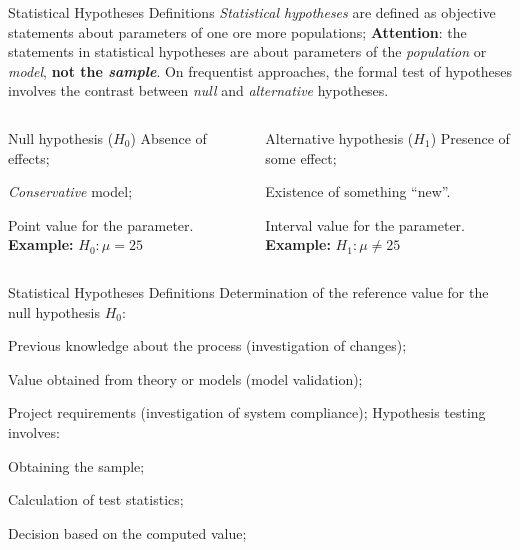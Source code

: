 \documentclass[t]{beamer}
\begin{document}

\begin{ftst}
{Statistical Hypotheses}
{Definitions}
\textit{Statistical hypotheses} are defined as objective statements about parameters of one ore more populations;
\vone
\textbf{Attention}: the statements in statistical hypotheses are about parameters of the \textit{population} or \textit{model}, \textbf{not the \textit{sample}}.
\vone
On frequentist approaches, the formal test of hypotheses involves the contrast between \textit{null} and \textit{alternative} hypotheses.
\begin{columns}[T]
	\begin{block}{Null hypothesis ($H_0$)}
	\small
	\bitems Absence of effects;
	\item \textit{Conservative} model;
	\item Point value for the parameter.\eitem
	\textbf{Example:} $H_0: \mu = 25$
	\end{block}
	\begin{block}{Alternative hypothesis ($H_1$)}
	\small 
	\bitems Presence of some effect;
	\item Existence of something ``new''.
	\item Interval value for the parameter.\eitem
	\textbf{Example:} $H_1: \mu \neq 25$
		\end{block}
	\end{columns}
\end{ftst}


\begin{ftst}
{Statistical Hypotheses}
{Definitions}
Determination of the reference value for the null hypothesis $H_0$:

\bitems Previous knowledge about the process (investigation of changes);
	\item Value obtained from theory or models (model validation);
	\item Project requirements (investigation of system compliance);
\eitem
\vone
Hypothesis testing involves:

\bitems Obtaining the sample;
	\item Calculation of test statistics;
	\item Decision based on the computed value;
\eitem
\end{ftst}

\end{document}
